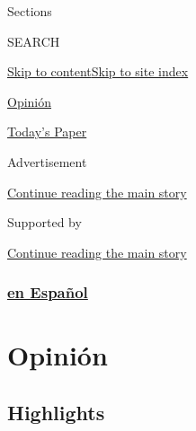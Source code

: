 Sections

SEARCH

\protect\hyperlink{site-content}{Skip to
content}\protect\hyperlink{site-index}{Skip to site index}

\href{https://www.nytimes.com/es/section/opinion}{Opinión}

\href{https://myaccount.nytimes.com/auth/login?response_type=cookie\&client_id=vi}{}

\href{https://www.nytimes.com/section/todayspaper}{Today's Paper}

Advertisement

\protect\hyperlink{after-top}{Continue reading the main story}

Supported by

\protect\hyperlink{after-sponsor}{Continue reading the main story}

\hypertarget{en-espauxf1ol}{%
\subsubsection{\texorpdfstring{\href{/es/}{en
Español}}{en Español}}\label{en-espauxf1ol}}

\hypertarget{opiniuxf3n}{%
\section{Opinión}\label{opiniuxf3n}}

\hypertarget{highlights}{%
\subsection{Highlights}\label{highlights}}

